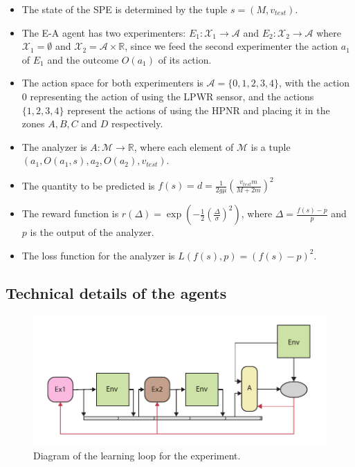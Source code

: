 \documentclass[11pt,a4paper,twoside]{report}
\newcommand{\+}{\textnormal{+} }
\theoremstyle{definition}
\numberwithin{equation}{chapter}
\begin{document}
\begin{itemize}
  \item The state of the SPE is determined by the tuple $s=(M,v_{test})$.
  \item The E-A agent has two experimenters: $E_1:\mathcal{X}_1
  \rightarrow\mathcal{A}$ and $E_2:\mathcal{X}_2 \rightarrow\mathcal{A}$ where
  $\mathcal{X}_1=\emptyset$ and $\mathcal{X}_2=\mathcal{A}\times \mathbb{R}$,
  since we feed the second experimenter the action $a_1$ of $E_1$ and the
  outcome $O(a_1)$ of its action.
  \item The action space for both experimenters is $\mathcal{A}=\{0,1,2,3,4\}$, 
  with the action $0$ representing the action of using the LPWR sensor, and
  the actions $\{1,2,3,4\}$ represent the actions of using the HPNR and placing 
  it in the zones $A, B, C$ and $D$ respectively.
  \item The analyzer is $A:\mathcal{M}\rightarrow \mathbb{R}$, where each element
  of $\mathcal{M}$ is a tuple \\
  $\left(a_1,O(a_1,s),a_2,O(a_2),v_{test}\right)$.
  \item The quantity to be predicted is
  $f(s)=d=\frac{1}{2g\mu}\left(\frac{v_{test}m}{M+2m} \right)^2$
  \item The reward function is 
  $r(\Delta)=\exp\left(-\frac{1}{2}\left( \frac{\Delta}{\sigma} \right)
  ^2\right)$, where $\Delta = \frac{f(s)-p}{p}$ and $p$ is the output of the
  analyzer.
  \item The loss function for the analyzer is $L(f(s),p)=(f(s)-p)^2$.
\end{itemize}

\subsection{Technical details of the agents}
\begin{figure}[H]
  \includegraphics[width=\columnwidth]{figures/Two-sensors.pdf}
  \caption{Diagram of the learning loop for the experiment.}
\end{figure}
\end{document}
